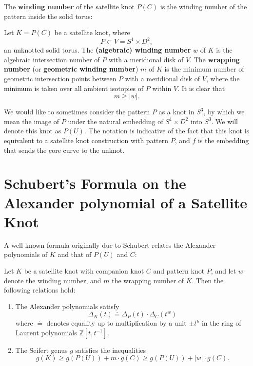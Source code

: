 The \textbf{winding number} of the satellite knot $P(C)$ is the winding number of the pattern inside the solid torus:
\begin{definition}
    Let $K = P(C)$ be a satellite knot, where
    \[
    P \subset V = S^1 \times D^2,
    \]
    an unknotted solid torus. The \textbf{(algebraic) winding number} $w$ of $K$ is the algebraic intersection number of $P$ with a meridional disk of $V$. The \textbf{wrapping number} (or \textbf{geometric winding number}) $m$ of $K$ is the minimum number of geometric intersection points between $P$ with a meridional disk of $V$, where the minimum is taken over all ambient isotopies of $P$ within $V$. It is clear that
    \[
    m \geq |w|.
    \]
\end{definition}

We would like to sometimes consider the pattern $P$ as a knot in $S^3$, by which we mean the image of $P$ under the natural embedding of $S^1 \times D^2$ into $S^3$. We will denote this knot as $P(U)$. The notation is indicative of the fact that this knot is equivalent to a satellite knot construction with pattern $P$, and $f$ is the embedding that sends the core curve to the unknot.

\section{Schubert's Formula on the Alexander polynomial of a Satellite Knot}
A well-known formula originally due to Schubert\cite{schubert1953knoten} relates the Alexander polynomials of $K$ and that of $P(U)$ and $C$:


\begin{theorem}\label{thm:schubert}
Let $K$ be a satellite knot with companion knot $C$ and pattern knot $P$, and let $w$ denote the winding number, and $m$ the wrapping number of $K$. Then the following relations hold:
\begin{enumerate}
    \item The Alexander polynomials satisfy
    \begin{equation}\label{eq:schubert_alex_poly}
        \Delta_K(t) \doteq \Delta_P(t) \cdot \Delta_C(t^w)
    \end{equation}
    where $\doteq$ denotes equality up to multiplication by a unit $\pm t^k$ in the ring of Laurent polynomials $\mathbb{Z}[t, t^{-1}]$.

    \item The Seifert genus $g$ satisfies the inequalities
    \[
    g(K) \geq g(P(U)) + m \cdot g(C) \geq g(P(U)) + |w| \cdot g(C).
    \]
\end{enumerate}
\end{theorem}


